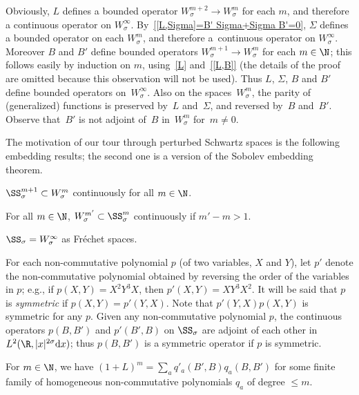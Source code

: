 Obviously, $L$ def\/ines a bounded operator $W_\sigma^{m+2}\to W_\sigma^m$ for each $m$, and therefore a continuous operator on $W_\sigma^\infty$. By~\eqref{[L,Sigma]=B' Sigma+Sigma B'=0}, $\Sigma$ def\/ines a bounded operator on each $W_\sigma^m$, and therefore a~continuous operator on $W_\sigma^\infty$. Moreover $B$ and $B'$ def\/ine bounded operators $W_\sigma^{m+1}\to W_\sigma^m$ for each $m\in\N$; this follows easily by induction on $m$, using~\eqref{L} and~\eqref{[L,B]} (the details of the proof are omitted because this observation will not be used). Thus $L$, $\Sigma$, $B$ and $B'$ def\/ine bounded operators on~$W_\sigma^\infty$. Also on the spaces~$W_\sigma^m$, the parity of (generalized) functions is preserved by~$L$ and~$\Sigma$, and reversed by~$B$ and~$B'$. Observe that~$B'$ is not adjoint of~$B$ in~$W_\sigma^m$ for~$m\ne0$.


The motivation of our tour through perturbed Schwartz spaces is the following embedding results; the second one is a version of the Sobolev embedding theorem.

\begin{Proposition}\label{p:SS sigma,m' subset W sigma m}
  $\SS_\sigma^{m+1}\subset W_\sigma^m$ continuously for all $m\in\N$.
\end{Proposition}

\begin{Proposition}\label{p:Sobolev}
  For all $m\in\N$, $W_\sigma^{m'}\subset\SS_\sigma^m$ continuously if $m'-m>1$.
\end{Proposition}

\begin{Corollary}\label{c:Sobolev}
  $\SS_\sigma=W_\sigma^\infty$ as Fr\'echet spaces.
\end{Corollary}

For each non-commutative polynomial $p$ (of two variables, $X$ and $Y$), let $p'$ denote the non-commutative polynomial obtained by reversing the order of the variables in $p$; e.g., if $p(X,Y)=X^2Y^3X$, then $p'(X,Y)=XY^3X^2$. It will be said that $p$ is {\em symmetric\/} if $p(X,Y)=p'(Y,X)$. Note that $p'(Y,X)p(X,Y)$ is symmetric for any $p$. Given any non-commutative polynomial $p$, the continuous operators $p(B,B')$ and $p'(B',B)$ on $\SS_\sigma$ are adjoint of each other in $L^2(\R,|x|^{2\sigma}{\rm d}x)$; thus $p(B,B')$ is a symmetric operator if $p$ is symmetric.

\begin{Lemma}\label{l:(1+L) m}
  For $m\in\N$, we have $(1+L)^m=\sum_aq'_a(B',B)q_a(B,B')$ for some finite family of homogeneous non-commutative polynomials $q_a$ of degree $\le m$.
\end{Lemma}

